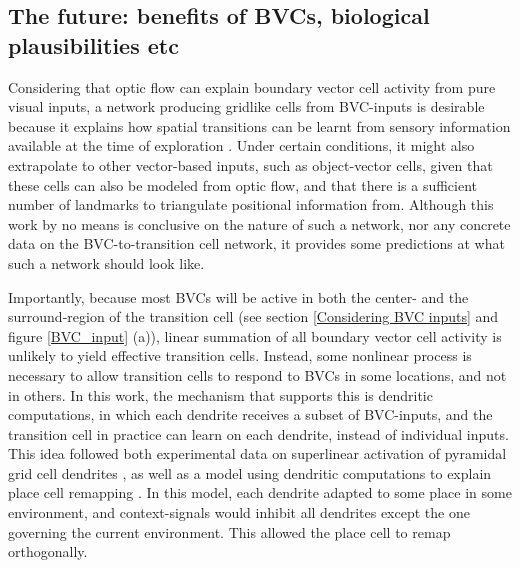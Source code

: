 \documentclass{article}
\begin{document}
    \subsection{The future: benefits of BVCs, biological plausibilities etc} \label{Future: BVCs}

    Considering that optic flow can explain boundary vector cell activity from pure visual inputs, a network producing gridlike cells from BVC-inputs is desirable because it explains how spatial transitions can be learnt from sensory information available at the time of exploration \parencite{Raudies2012}. Under certain conditions, it might also extrapolate to other vector-based inputs, such as object-vector cells, given that these cells can also be modeled from optic flow, and that there is a sufficient number of landmarks to triangulate positional information from. Although this work by no means is conclusive on the nature of such a network, nor any concrete data on the BVC-to-transition cell network, it provides some predictions at what such a network should look like.

    Importantly, because most BVCs will be active in both the center- and the surround-region of the transition cell (see section \ref{Considering BVC inputs} and figure \ref{BVC_input} (a)), linear summation of all boundary vector cell activity is unlikely to yield effective transition cells. Instead, some nonlinear process is necessary to allow transition cells to respond to BVCs in some locations, and not in others. In this work, the mechanism that supports this is dendritic computations, in which each dendrite receives a subset of BVC-inputs, and the transition cell in practice can learn on each dendrite, instead of individual inputs. This idea followed both experimental data on superlinear activation of pyramidal grid cell dendrites \parencite{Schmidt-Hieber2017}, as well as a model using dendritic computations to explain place cell remapping \parencite{Alabi2022}. In this model, each dendrite adapted to some place in some environment, and context-signals would inhibit all dendrites except the one governing the current environment. This allowed the place cell to remap orthogonally.
\end{document}
